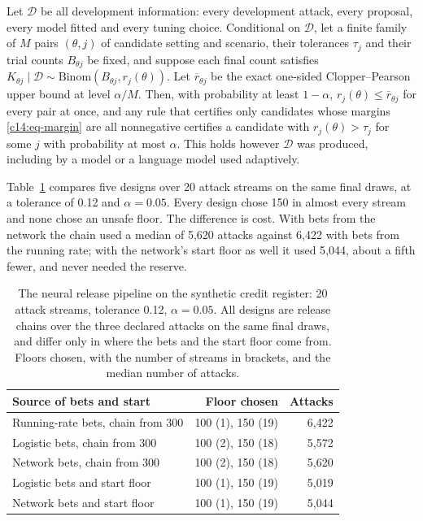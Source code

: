 \begin{proposition}\label{c14:prop-gate}
Let $\mathcal D$ be all development information: every development attack, every
proposal, every model fitted and every tuning choice. Conditional on $\mathcal D$, let
a finite family of $M$ pairs $(\theta, j)$ of candidate setting and scenario, their
tolerances $\tau_j$ and their trial counts $B_{\theta j}$ be fixed, and suppose each
final count satisfies $K_{\theta j} \mid \mathcal D \sim \mathrm{Binom}(B_{\theta j},
r_j(\theta))$. Let $\overline r_{\theta j}$ be the exact one-sided Clopper--Pearson
upper bound at level $\alpha/M$. Then, with probability at least $1-\alpha$,
$r_j(\theta) \le \overline r_{\theta j}$ for every pair at once, and any rule that
certifies only candidates whose margins \eqref{c14:eq-margin} are all nonnegative
certifies a candidate with $r_j(\theta) > \tau_j$ for some $j$ with probability at
most $\alpha$. This holds however $\mathcal D$ was produced, including by a model or a
language model used adaptively.
\end{proposition}

Table~\ref{c14:tab-pipeline} compares five designs over 20 attack streams on the same
final draws, at a tolerance of 0.12 and $\alpha = 0.05$. Every design chose 150 in
almost every stream and none chose an unsafe floor. The difference is cost. With bets
from the network the chain used a median of 5{,}620 attacks against 6{,}422 with bets
from the running rate; with the network's start floor as well it used 5{,}044, about a
fifth fewer, and never needed the reserve.

\begin{table}[ht]
\centering
\caption{The neural release pipeline on the synthetic credit register: 20 attack
streams, tolerance 0.12, $\alpha=0.05$. All designs are release chains over the
three declared attacks on the same final draws, and differ only in where the bets and
the start floor come from. Floors chosen, with the number of streams in brackets, and
the median number of attacks.}
\label{c14:tab-pipeline}
\small
\begin{tabular}{lrr}
\toprule
Source of bets and start & Floor chosen & Attacks \\
\midrule
Running-rate bets, chain from 300 & 100 (1), 150 (19) & 6{,}422 \\
Logistic bets, chain from 300     & 100 (2), 150 (18) & 5{,}572 \\
Network bets, chain from 300      & 100 (2), 150 (18) & 5{,}620 \\
Logistic bets and start floor     & 100 (1), 150 (19) & 5{,}019 \\
Network bets and start floor      & 100 (1), 150 (19) & 5{,}044 \\
\bottomrule
\end{tabular}
\end{table}

